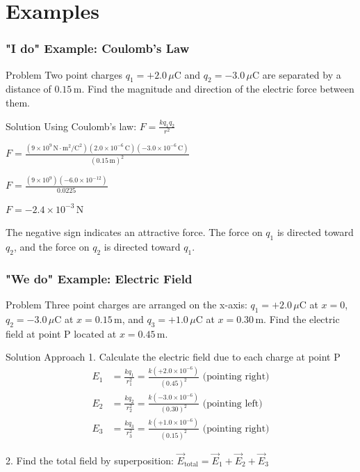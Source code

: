 \documentclass{beamer}
\begin{document}
\section{Examples}

\begin{frame}
    \frametitle{"I do" Example: Coulomb's Law}
    \begin{block}{Problem}
        Two point charges $q_1 = +2.0 \, \mu\text{C}$ and $q_2 = -3.0 \, \mu\text{C}$ are separated by a distance of $0.15 \, \text{m}$. Find the magnitude and direction of the electric force between them.
    \end{block}
    \pause
    \begin{block}{Solution}
        Using Coulomb's law: $F = \frac{kq_1q_2}{r^2}$
        
        $F = \frac{(9 \times 10^9 \, \text{N} \cdot \text{m}^2/\text{C}^2)(2.0 \times 10^{-6} \, \text{C})(-3.0 \times 10^{-6} \, \text{C})}{(0.15 \, \text{m})^2}$
        
        $F = \frac{(9 \times 10^9)(-6.0 \times 10^{-12})}{0.0225}$
        
        $F = -2.4 \times 10^{-3} \, \text{N}$
        
        The negative sign indicates an attractive force. The force on $q_1$ is directed toward $q_2$, and the force on $q_2$ is directed toward $q_1$.
    \end{block}
\end{frame}

\begin{frame}
    \frametitle{"We do" Example: Electric Field}
    \begin{block}{Problem}
        Three point charges are arranged on the x-axis: $q_1 = +2.0 \, \mu\text{C}$ at $x = 0$, $q_2 = -3.0 \, \mu\text{C}$ at $x = 0.15 \, \text{m}$, and $q_3 = +1.0 \, \mu\text{C}$ at $x = 0.30 \, \text{m}$. Find the electric field at point P located at $x = 0.45 \, \text{m}$.
    \end{block}
        \pause

    \begin{block}{Solution Approach}
        1. Calculate the electric field due to each charge at point P
        \begin{align}
            E_1 &= \frac{kq_1}{r_1^2} = \frac{k(+2.0 \times 10^{-6})}{(0.45)^2} \text{ (pointing right)} \\
            E_2 &= \frac{kq_2}{r_2^2} = \frac{k(-3.0 \times 10^{-6})}{(0.30)^2} \text{ (pointing left)} \\
            E_3 &= \frac{kq_3}{r_3^2} = \frac{k(+1.0 \times 10^{-6})}{(0.15)^2} \text{ (pointing right)}
        \end{align}
        
        2. Find the total field by superposition: $\vec{E}_{\text{total}} = \vec{E}_1 + \vec{E}_2 + \vec{E}_3$
    \end{block}
\end{frame}
\end{document}
